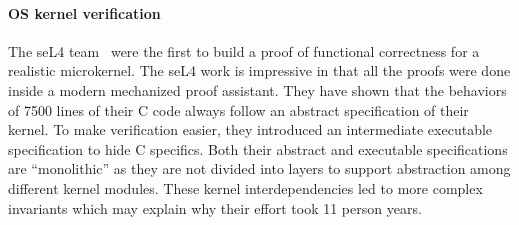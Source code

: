 %
% 
%
%
% 
%
%
%

\paragraph{OS kernel verification} The seL4
team~\cite{klein2009sel4} were the first to build a proof of
functional correctness for a realistic microkernel.  The seL4 work is
impressive in that all the proofs were done inside a modern mechanized
proof assistant. They have shown that the behaviors of 7500 lines of
their C code always follow an abstract specification of their
kernel. To make verification easier, they introduced an intermediate
executable specification to hide C specifics. Both their abstract and
executable specifications are ``monolithic'' as they are not divided
into layers to support abstraction among different kernel modules.
These kernel interdependencies led to more complex invariants which
may explain why their effort took 11 person years.

